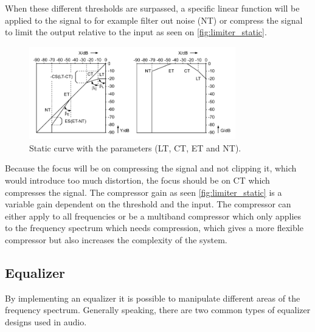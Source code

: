 When these different thresholds are surpassed, a specific linear function will be applied to the signal to for example filter out noise (NT) or compress the signal to limit the output relative to the input as seen on \autoref{fig:limiter_static}. 

\begin{figure}[H]
\centering
\includegraphics[width=0.8\textwidth]{figures/limiter_static_curve.png}
\caption{Static curve with the parameters (LT, CT, ET and NT).}
\label{fig:limiter_static}
\end{figure}  

Because the focus will be on compressing the signal and not clipping it, which would introduce too much distortion, the focus should be on CT which compresses the signal. The compressor gain as seen \autoref{fig:limiter_static} is a variable gain dependent on the threshold and the input. The compressor can either apply to all frequencies or be a multiband compressor which only applies to the frequency spectrum which needs compression, which gives a more flexible compressor but also increases the complexity of the system. 

\subsection*{Equalizer}
By implementing an equalizer it is possible to manipulate different areas of the frequency spectrum. Generally speaking, there are two common types of equalizer designs used in audio.

